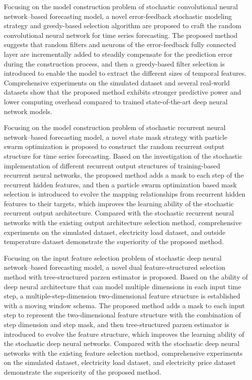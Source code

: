 {    Focusing on the model construction problem of stochastic convolutional neural network--based forecasting model, a novel error-feedback stochastic modeling strategy and greedy-based selection algorithm are proposed to craft the random convolutional neural network for time series forecasting. The proposed method suggests that random filters and neurons of the error-feedback fully connected layer are incrementally added to steadily compensate for the prediction error during the construction process, and then a greedy-based filter selection is introduced to enable the model to extract the different sizes of temporal features. Comprehensive experiments on the simulated dataset and several real-world datasets show that the proposed method exhibits stronger predictive power and lower computing overhead compared to trained state-of-the-art deep neural network models.

    Focusing on the model construction problem of stochastic recurrent neural network--based forecasting model, a novel state mask strategy with particle swarm optimization is proposed to construct the random recurrent output structure for time series forecasting. Based on the investigation of the stochastic implementation of different recurrent output structures of training-based recurrent neural networks, the proposed method adds a mask to each step of the recurrent hidden features, and then a particle swarm optimization based mask selection is introduced to evolve the mapping relationships from recurrent hidden features to their targets, which improves the learning ability of the stochastic recurrent output architecture. Compared with the stochastic recurrent neural networks with the existing output architecture selection method, comprehensive experiments on the simulated dataset, electricity load dataset, and outside temperature dataset demonstrate the superiority of the proposed method. 

    Focusing on the input feature selection problem of stochastic deep neural network--based forecasting model, a novel dual feature-structured selection method with tree-structured parzen estimator is proposed. Based on the ability of deep neural architecture that can model multiple dimensions in each input time step, a multiple-step-dimension two-dimensional feature structure is established with a moving window schema. The proposed method adds a mask to each input step to represent the two-dimensional feature structure with the combination of step dimension and step mask, and then tree-structured parzen estimator is introduced to evolve the feature structure, which improves the learning ability of the stochastic deep neural networks. Compared with the stochastic deep neural networks with the existing feature selection method, comprehensive experiments on the simulated dataset, electricity load dataset, and electricity price dataset demonstrate the superiority of the proposed method.

}
